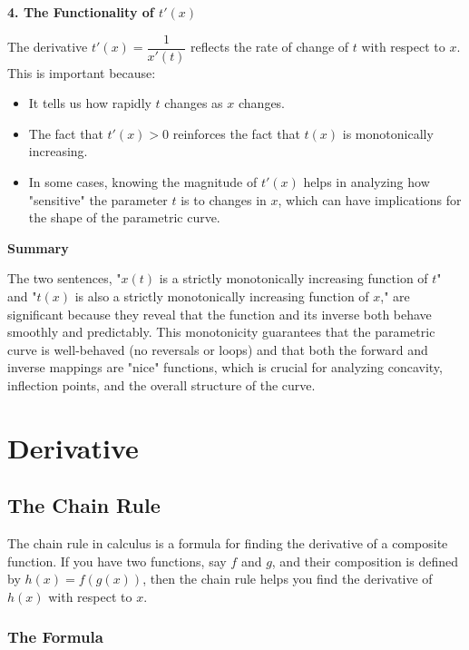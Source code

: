 \documentclass[a4paper,12pt]{book}
\begin{document}
\textbf{4. The Functionality of \( t'(x) \)}

The derivative \( t'(x) = \dfrac{1}{x'(t)} \) reflects the rate of change of \( t \) with respect to \( x \). This is important because:

\begin{itemize}
	\item 
	It tells us how rapidly \( t \) changes as \( x \) changes.
	\item 
	The fact that \( t'(x) > 0 \) reinforces the fact that \( t(x) \) is monotonically increasing.
	\item 
	In some cases, knowing the magnitude of \( t'(x) \) helps in analyzing how "sensitive" the parameter \( t \) is to changes in \( x \), which can have implications for the shape of the parametric curve.
\end{itemize}

\textbf{Summary}

The two sentences, "\( x(t) \) is a strictly monotonically increasing function of \( t \)" and "\( t(x) \) is also a strictly monotonically increasing function of \( x \)," are significant because they reveal that the function and its inverse both behave smoothly and predictably. This monotonicity guarantees that the parametric curve is well-behaved (no reversals or loops) and that both the forward and inverse mappings are "nice" functions, which is crucial for analyzing concavity, inflection points, and the overall structure of the curve.

%
%
%
%

\chapter{Derivative}

\section{The Chain Rule}

\label{sec:chain_rule}

The chain rule in calculus is a formula for finding the derivative of a composite function. If you have two functions, say \( f \) and \( g \), and their composition is defined by \( h(x) = f(g(x)) \), then the chain rule helps you find the derivative of \( h(x) \) with respect to \( x \).

\subsection{The Formula}
\end{document}
